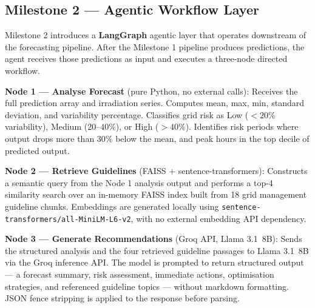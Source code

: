 \documentclass[11pt, a4paper]{article}
\begin{document}
\subsection{Milestone 2 — Agentic Workflow Layer}

Milestone 2 introduces a \textbf{LangGraph} agentic layer that operates downstream of the
forecasting pipeline. After the Milestone 1 pipeline produces predictions, the agent
receives those predictions as input and executes a three-node directed workflow.

\medskip
\begin{center}
\end{center}
\medskip

\noindent\textbf{Node 1 — Analyse Forecast} (pure Python, no external calls):
Receives the full prediction array and irradiation series. Computes mean, max, min, standard
deviation, and variability percentage. Classifies grid risk as Low ($< 20\%$ variability),
Medium ($20$–$40\%$), or High ($> 40\%$). Identifies risk periods where output drops more than
30\% below the mean, and peak hours in the top decile of predicted output.

\medskip
\noindent\textbf{Node 2 — Retrieve Guidelines} (FAISS + sentence-transformers):
Constructs a semantic query from the Node 1 analysis output and performs a top-4 similarity
search over an in-memory FAISS index built from 18 grid management guideline chunks.
Embeddings are generated locally using \texttt{sentence-transformers/all-MiniLM-L6-v2},
with no external embedding API dependency.

\medskip
\noindent\textbf{Node 3 — Generate Recommendations} (Groq API, Llama 3.1~8B):
Sends the structured analysis and the four retrieved guideline passages to Llama 3.1~8B via
the Groq inference API. The model is prompted to return structured output — a forecast
summary, risk assessment, immediate actions, optimisation strategies, and referenced
guideline topics — without markdown formatting. JSON fence stripping is applied to the
response before parsing.
\end{document}
